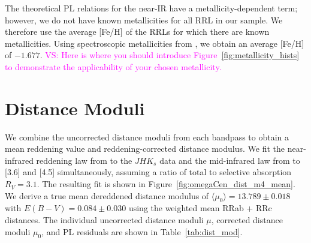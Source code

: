 \documentclass[a4paper,fleqn,usenatbib]{mnras}
\providecommand{\vscomment}[1]{{\textcolor{magenta}{{VS: #1}}}\xspace}
\begin{document}
The theoretical PL relations for the near-IR have a metallicity-dependent term; however, we do not have known metallicities for all RRL in our sample. We therefore use the average [Fe/H] of the RRLs for which there are known metallicities. Using spectroscopic metallicities from \citet{2006ApJ...640L..43S}, we obtain an average [Fe/H] of $-1.677$. \vscomment{Here is where you should introduce Figure~\ref{fig:metallicity_hists} to demonstrate the applicability of your chosen metallicity.}

\section{Distance Moduli}
\label{sec:distance_moduli}

We combine the uncorrected distance moduli from each bandpass to obtain a mean reddening value and reddening-corrected distance modulus. We fit the near-infrared reddening law from \citet{1989ApJ...345..245C} to the $JHK_s$ data and the mid-infrared law from \citet{2005ApJ...619..931I} to [3.6] and [4.5] simultaneously, assuming a ratio of total to selective absorption $R_V = 3.1$. The resulting fit is shown in Figure~\ref{fig:omegaCen_dist_m4_mean}. We derive a true mean dereddened distance modulus of $\langle \mu_0 \rangle = 13.789 \pm 0.018$ with $E(B-V) = 0.084 \pm 0.030$ using the weighted mean RRab + RRc distances. The individual uncorrected distance moduli $\mu$, corrected distance moduli $\mu_0$, and PL residuals are shown in Table~\ref{tab:dist_mod}.
\end{document}
